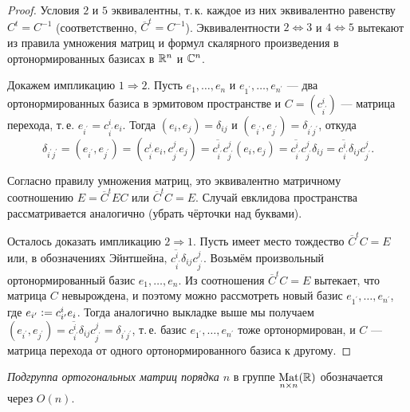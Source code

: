 \begin{proof}
    Условия $2$ и $5$ эквивалентны, т.\,к. каждое из них эквивалентно равенству $C^t = C^{-1}$ (соответственно, $\overline{C}^t = C^{-1}$). Эквивалентности $2 \Leftrightarrow 3$ и $4 \Leftrightarrow 5$ вытекают из правила умножения матриц и формул скалярного произведения в ортонормированных базисах в $\mathbb{R}^n$ и $\mathbb{C}^n$.

    Докажем импликацию $1 \Rightarrow 2$. Пусть $e_1, \ldots, e_n$ и $e_{1^\prime}, \ldots, e_{n^\prime}$ --- два ортонормированных базиса в эрмитовом пространстве и $C = (c^i_{i^\prime})$ --- матрица перехода, т.\,е. $e_{i^\prime} = c^i_{i^\prime}e_i$. Тогда $(e_i, e_j) = \delta_{ij}$ и $(e_{i^\prime}, e_{j^\prime}) = \delta_{i^\prime j^\prime}$, откуда
    \[
        \delta_{i^\prime j^\prime} = (e_{i^\prime}, e_{j^\prime}) = (c^i_{i^\prime}e_i, c^j_{j^\prime}e_j) = \overline{c^i_{i^\prime}}c^j_{j^\prime}(e_i, e_j) = \overline{c^i_{i^\prime}}c^j_{j^\prime}\delta_{ij} = \overline{c^i_{i^\prime}}\delta_{ij}c^j_{j^\prime}.
    \]

    Согласно правилу умножения матриц, это эквивалентно матричному соотношению $E = \overline{C}^tEC$ или $\overline{C}^tC = E$. Случай евклидова пространства рассматривается аналогично (убрать чёрточки над буквами).

    Осталось доказать импликацию $2 \Rightarrow 1$. Пусть имеет место тождество $\overline{C}^tC = E$ или, в обозначениях Эйнтшейна, $\overline{c^i_{i^\prime}}\delta_{ij}c^j_{j^\prime}$. Возьмём произвольный ортонормированный базис $e_1, \ldots, e_n$. Из соотношения $\overline{C}^tC = E$ вытекает, что матрица $C$ невырождена, и поэтому можно рассмотреть новый базис $e_{1^\prime}, \ldots, e_{n^\prime}$, где $e_{i^\prime} \vcentcolon = c^i_{i^\prime}e_i$. Тогда аналогично выкладке выше мы получаем $(e_{i^\prime}, e_{j^\prime}) = \overline{c^i_{i^\prime}}\delta_{ij}c^j_{j^\prime} = \delta_{i^\prime j^\prime}$, т.\,е. базис $e_{1^\prime}, \ldots, e_{n^\prime}$ тоже ортонормирован, и $C$ --- матрица перехода от одного ортонормированного базиса к другому.
\end{proof}

\begin{definition}
    \textit{Подгруппа ортогональных матриц порядка $n$} в группе $\underset{n \times n}{\operatorname{Mat}}(\mathbb{R})$ обозначается через $O(n)$.
\end{definition}

